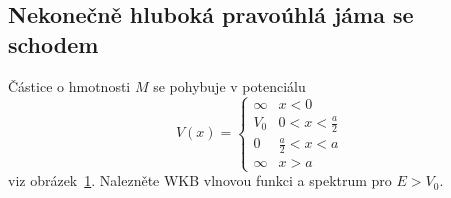 \subsection{Nekonečně hluboká pravoúhlá jáma se schodem}   
Částice o hmotnosti $M$ se pohybuje v potenciálu
\begin{equation}
    V(x)=\left\{\begin{array}{ll} \infty & x<0 \\ V_{0} & 0<x<\frac{a}{2} \\ 0 & \frac{a}{2}<x<a \\ \infty & x>a\end{array}\right.
\end{equation}
viz obrázek~\ref{fig:WKBStep}.
Nalezněte WKB vlnovou funkci a spektrum pro $E>V_{0}$.

\begin{figure}[!htbp]
	\centering
	\label{fig:WKBStep}
\end{figure}		
	
